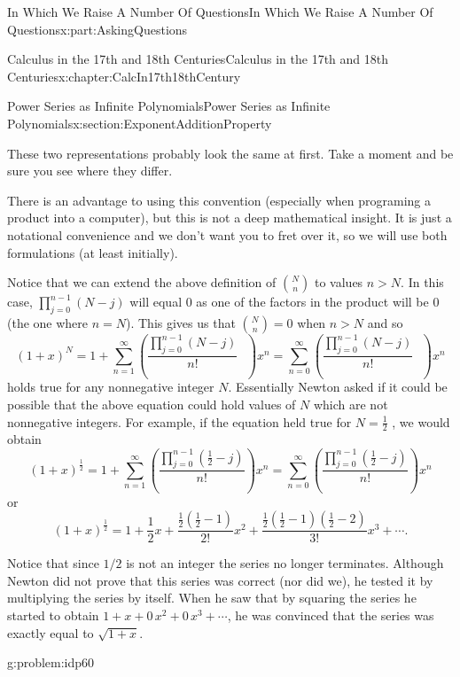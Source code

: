 \documentclass[oneside,10pt,]{book}
\numberwithin{equation}{section}
\begin{document}
\begin{partptx}{In Which We Raise A Number Of Questions}{}{In Which We Raise A Number Of Questions}{}{}{x:part:AskingQuestions}
\begin{chapterptx}{Calculus in the 17th and 18th Centuries}{}{Calculus in the 17th and 18th Centuries}{}{}{x:chapter:CalcIn17th18thCentury}
\begin{sectionptx}{Power Series as Infinite Polynomials}{}{Power Series as Infinite Polynomials}{}{}{x:section:ExponentAdditionProperty}
\begin{equation*}
\end{equation*}
%
\par
These two representations probably look the same at first. Take a moment and be sure you see where they differ.%
\par
There is an advantage to using this convention (especially when programing a product into a computer), but this is not a deep mathematical insight. It is just a notational convenience and we don't want you to fret over it, so we will use both formulations (at least initially).%
\par
Notice that we can extend the above definition of \(\binom{N}{n}\) to values \(n>N\). In this case, \(\prod_{j=0}^{n-1}\left(N-j\right)\) will equal 0 as one of the factors in the product will be \(0\) (the one where \(n=N\)). This gives us that \(\binom{N}{n}=0\) when \(n>N\) and so%
\begin{equation*}
\left(1+x\right)^N=1+\sum_{n=1}^\infty\left(\frac{\prod_{j=0}^{n-1}\left(N-j\right)}{n!}\text{ } \right)x^n= \sum_{n=0}^\infty\left(\frac{\prod_{j=0}^{n-1}\left(N-j\right)}{n!}\text{ } \right)x^n
\end{equation*}
holds true for any nonnegative integer \(N\). Essentially Newton asked if it could be possible that the above equation could hold values of \(N\) which are not nonnegative integers. For example, if the equation held true for \(N=\frac{1}{2}\) , we would obtain%
\begin{equation*}
\left(1+x\right)^{\frac{1}{2}}=1+\sum_{n=1}^\infty\left(\frac{ \prod_{j=0}^{n-1}\left(\frac{1}{2}-j\right)}{n!}\right)x^n=\sum_{n=0}^\infty\left(\frac{ \prod_{j=0}^{n-1}\left(\frac{1}{2}-j\right)}{n!}\right)x^n
\end{equation*}
or%
\begin{equation}
\left(1+x\right)^{\frac{1}{2}}=1+\frac{1}{2}x+\frac{\frac{1}{2}\left(\frac{1}{2}-1\right)}{2!}x^2+\frac{\frac{1}{2}\left(\frac{1}{2}-1\right)\left(\frac{1}{2}-2\right)}{3!}x^3+\cdots\text{.}\label{x:men:eq_BinomialSeries}
\end{equation}
%
\par
Notice that since \(1/2\) is not an integer the series no longer terminates. Although Newton did not prove that this series was correct (nor did we), he tested it by multiplying the series by itself. When he saw that by squaring the series he started to obtain \(1+x+0\,x^2+0\,x^3+\cdots\), he was convinced that the series was exactly equal to \(\sqrt{1+x}\).%
\begin{problem}{}{g:problem:idp60}%
%

\end{problem}
\end{sectionptx}
\end{chapterptx}
\end{partptx}
\end{document}

